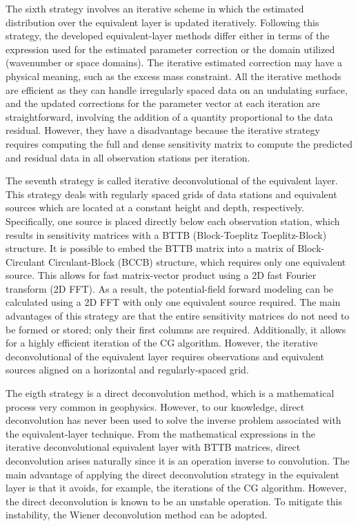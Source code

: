 The sixth strategy involves an iterative scheme in which the estimated  distribution over the equivalent layer is updated iteratively. 
Following this strategy, the developed equivalent-layer methods differ 
either in terms of the expression used for the estimated parameter correction 
or the domain utilized (wavenumber or space domains). 
The iterative estimated correction may have a physical meaning, such as the excess mass constraint. 
All the iterative methods are efficient as they can handle irregularly spaced data on an undulating surface, and the updated corrections for the parameter vector at each iteration are straightforward, involving the addition of a quantity proportional to the data residual.
However, they have a disadvantage because the iterative strategy requires computing the full and dense sensitivity matrix to compute 
the predicted and residual data in all observation stations per iteration.


The seventh strategy is called iterative deconvolutional of the equivalent layer.
This strategy deals with regularly spaced grids of data stations and equivalent sources which are located at a constant height and depth, respectively. 
Specifically, one source is placed directly below each observation station, which results in sensitivity matrices with a BTTB (Block-Toeplitz Toeplitz-Block) structure. 
It is possible to embed the BTTB matrix into a matrix of Block-Circulant Circulant-Block (BCCB) structure, which requires only one equivalent source. 
This allows for fast matrix-vector product using a 2D fast Fourier transform (2D FFT). 
As a result, the potential-field forward modeling can be calculated using 
a 2D FFT with only one equivalent source required. 
The main advantages of this strategy are that the entire sensitivity matrices do not need to be formed or stored; only their first columns are required. Additionally, it allows for a highly efficient iteration of the CG algorithm.
However, the iterative deconvolutional of the equivalent layer requires 
observations and equivalent sources aligned on a horizontal and regularly-spaced grid.


The eigth strategy is a direct deconvolution method, which is a mathematical process very common in geophysics. 
However, to our knowledge, direct deconvolution has never been used to solve the inverse problem associated with the equivalent-layer technique. 
From the mathematical expressions in the iterative deconvolutional equivalent layer with BTTB matrices, direct deconvolution arises naturally since it is an operation inverse to convolution. 
The main advantage of applying the direct deconvolution strategy in the equivalent layer is that it avoids, for example, the  iterations of the CG algorithm. 
However, the direct deconvolution is known to be an unstable operation.
To mitigate this instability, the Wiener deconvolution method can be adopted.




